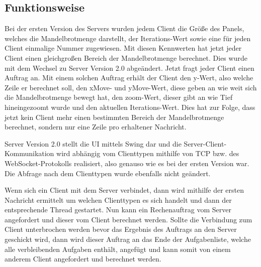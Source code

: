 \documentclass[12pt, onecolumn, notitlepage]{scrartcl}
\begin{document}
\subsection{Funktionsweise}
Bei der ersten Version des Servers wurden jedem Client die Größe des Panels, welches die Mandelbrotmenge darstellt, der Iterations-Wert sowie eine für jeden Client einmalige Nummer zugewiesen. Mit diesen Kennwerten hat jetzt jeder Client einen gleichgroßen Bereich der Mandelbrotmenge berechnet. Dies wurde mit dem Wechsel zu Server Version 2.0 abgeändert. Jetzt fragt jeder Client einen Auftrag an. Mit einem solchen Auftrag erhält der Client den y-Wert, also welche Zeile er berechnet soll, den xMove- und yMove-Wert, diese geben an wie weit sich die Mandelbrotmenge bewegt hat, den zoom-Wert, dieser gibt an wie Tief hineingezoomt wurde und den aktuellen Iterations-Wert. Dies hat zur Folge, dass jetzt kein Client mehr einen bestimmten Bereich der Mandelbrotmenge berechnet, sondern nur eine Zeile pro erhaltener Nachricht. \par
Server Version 2.0 stellt die UI mittels Swing dar und die Server-Client-Kommunikation wird abhängig vom Clienttypen mithilfe von TCP bzw. des WebSocket-Protokolls realisiert, also genauso wie es bei der ersten Version war. Die Abfrage nach dem Clienttypen wurde ebenfalls nicht geändert. \par
Wenn sich ein Client mit dem Server verbindet, dann wird mithilfe der ersten Nachricht ermittelt um welchen Clienttypen es sich handelt und dann der entsprechende Thread gestartet. Nun kann ein Rechenauftrag vom Server angefordert und dieser vom Client berechnet werden. Sollte die Verbindung zum Client unterbrochen werden bevor das Ergebnis des Auftrags an den Server geschickt wird, dann wird dieser Auftrag an das Ende der Aufgabenliste, welche alle verbleibenden Aufgaben enthält, angefügt und kann somit von einem anderem Client angefordert und berechnet werden.
\end{document}
